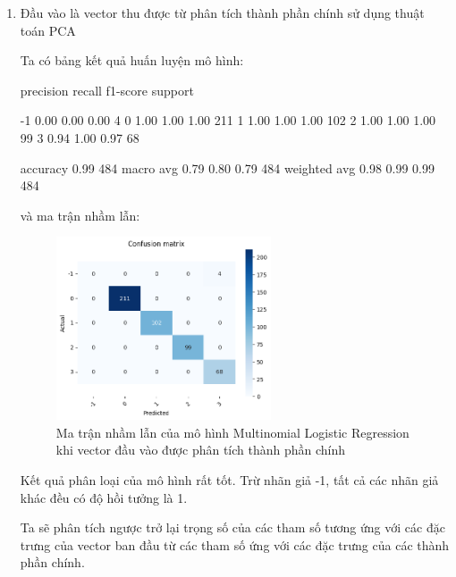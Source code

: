 \begin{enumerate}[label=(\alph*)]
    \item Đầu vào là vector thu được từ phân tích thành phần chính sử dụng thuật toán PCA 
    
    Ta có bảng kết quả huấn luyện mô hình:

    \begin{python}
        precision    recall  f1-score   support

          -1       0.00      0.00      0.00         4
           0       1.00      1.00      1.00       211
           1       1.00      1.00      1.00       102
           2       1.00      1.00      1.00        99
           3       0.94      1.00      0.97        68

    accuracy                           0.99       484
   macro avg       0.79      0.80      0.79       484
weighted avg       0.98      0.99      0.99       484
    \end{python}

    và ma trận nhầm lẫn:

    \begin{figure}[H]
        \centering
        \includegraphics[width=0.6\textwidth]{figures/Thanh/Data_Analysis/With_null_confusion_matrix_Logistic_PCA_features.png}
        \caption{Ma trận nhầm lẫn của mô hình Multinomial Logistic Regression khi vector đầu vào được phân tích thành phần chính}
        \label{fig:With_null_confusion_matrix_Logistic_PCA_features}
    \end{figure}

    Kết quả phân loại của mô hình rất tốt.
    Trừ nhãn giả -1, tất cả các nhãn giả khác đều có độ hồi tưởng là 1.

    Ta sẽ phân tích ngược trở lại trọng số của các tham số tương ứng với các đặc trưng của vector ban đầu từ các tham số ứng với các đặc trưng của các thành phần chính.


\end{enumerate}
